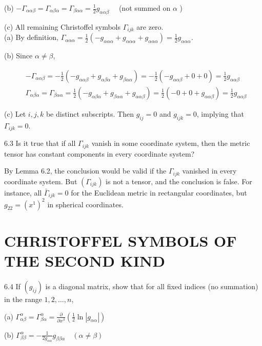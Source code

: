 \documentclass[10pt]{article}
\begin{document}
(b) $-\Gamma_{\alpha \alpha \beta}=\Gamma_{\alpha \beta \alpha}=\Gamma_{\beta \alpha \alpha}=\frac{1}{2} g_{\alpha \alpha \beta} \quad$ (not summed on $\alpha$ )

(c) All remaining Christoffel symbols $\Gamma_{i j k}$ are zero.\\
(a) By definition, $\Gamma_{\alpha \alpha \alpha}=\frac{1}{2}\left(-g_{\alpha \alpha \alpha}+g_{\alpha \alpha \alpha}+g_{\alpha \alpha \alpha}\right)=\frac{1}{2} g_{\alpha \alpha \alpha}$.

(b) Since $\alpha \neq \beta$,

$$
\begin{aligned}
& -\Gamma_{\alpha \alpha \beta}=-\frac{1}{2}\left(-g_{\alpha \alpha \beta}+g_{\alpha \beta \alpha}+g_{\beta \alpha \alpha}\right)=-\frac{1}{2}\left(-g_{\alpha \alpha \beta}+0+0\right)=\frac{1}{2} g_{\alpha \alpha \beta} \\
& \Gamma_{\alpha \beta \alpha}=\Gamma_{\beta \alpha \alpha}=\frac{1}{2}\left(-g_{\alpha \beta \alpha}+g_{\beta \alpha \alpha}+g_{\alpha \alpha \beta}\right)=\frac{1}{2}\left(-0+0+g_{\alpha \alpha \beta}\right)=\frac{1}{2} g_{\alpha \alpha \beta}
\end{aligned}
$$

(c) Let $i, j, k$ be distinct subscripts. Then $g_{i j}=0$ and $g_{i j k}=0$, implying that $\Gamma_{i j k}=0$.

6.3 Is it true that if all $\Gamma_{i j k}$ vanish in some coordinate system, then the metric tensor has constant components in every coordinate system?

By Lemma 6.2, the conclusion would be valid if the $\Gamma_{i j k}$ vanished in every coordinate system. But $\left(\Gamma_{i j k}\right)$ is not a tensor, and the conclusion is false. For instance, all $\bar{\Gamma}_{i j k}=0$ for the Euclidean metric in rectangular coordinates, but $g_{22}=\left(x^{1}\right)^{2}$ in spherical coordinates.

\section*{CHRISTOFFEL SYMBOLS OF THE SECOND KIND}
6.4 If $\left(g_{i j}\right)$ is a diagonal matrix, show that for all fixed indices (no summation) in the range $1,2, \ldots, n$,

(a) $\Gamma_{\alpha \beta}^{\alpha}=\Gamma_{\beta \alpha}^{\alpha}=\frac{\partial}{\partial x^{\beta}}\left(\frac{1}{2} \ln \left|g_{\alpha \alpha}\right|\right)$

(b) $\Gamma_{\beta \beta}^{\alpha}=-\frac{1}{2 g_{\alpha \alpha}} g_{\beta \beta \alpha} \quad(\alpha \neq \beta)$
\end{document}
